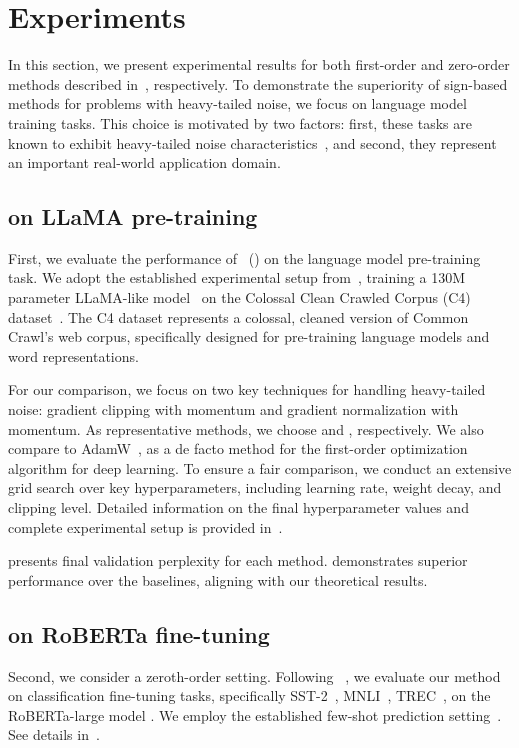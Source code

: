 \vspace{-8pt}
\section{Experiments}\label{sec:experiments}
In this section, we present experimental results for both first-order and zero-order methods described in~, respectively. 
To demonstrate the superiority of sign-based methods for problems with heavy-tailed noise, we focus on language model training tasks. 
This choice is motivated by two factors: first, these tasks are known to exhibit heavy-tailed noise characteristics~\citep{zhang2020adaptive}, and second, they represent an important real-world application domain.
\subsection{ on LLaMA pre-training}
First, we evaluate the performance of ~() on the language model pre-training task. 
We adopt the established experimental setup from~\cite{relora}, training a 130M parameter LLaMA-like model~\citep{llama} on the Colossal Clean Crawled Corpus (C4) dataset~\citep{c4}. 
The C4 dataset represents a colossal, cleaned version of Common Crawl's web corpus, specifically designed for pre-training language models and word representations.

For our comparison, we focus on two key techniques for handling heavy-tailed noise: gradient clipping with momentum and gradient normalization with momentum. As representative methods, we choose  \cite{zhang2020improved} and  \cite{cutkosky2020momentum}, respectively.
We also compare to AdamW~\cite{loshchilov2017decoupled}, as a de facto method for the first-order optimization algorithm for deep learning.
To ensure a fair comparison, we conduct an extensive grid search over key hyperparameters, including learning rate, weight decay, and clipping level. 
Detailed information on the final hyperparameter values and complete experimental setup is provided in~.

 presents final validation perplexity 
for each method. 
 demonstrates superior performance over the baselines, aligning with our theoretical results.

\vspace{-5pt}
\subsection{ on RoBERTa fine-tuning}
Second, we consider a zeroth-order setting. Following ~\citep{mezo}, we evaluate our method on classification fine-tuning tasks, specifically SST-2~\citep{sst2}, MNLI~\citep{mnli}, TREC~\citep{trec}, on the RoBERTa-large model \cite{roberta}. 
We employ the established few-shot prediction setting~\citep{finetune_setup_1,finetune_setup_2}. See details in~.

